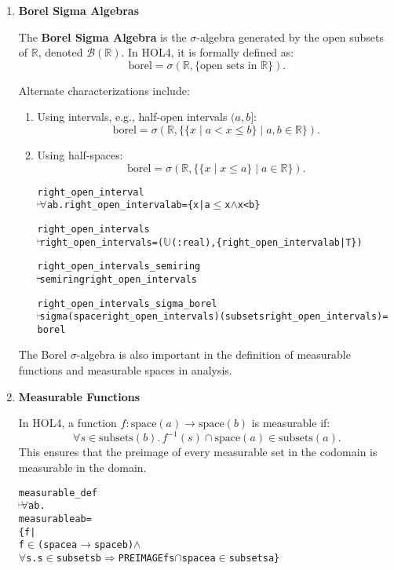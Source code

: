 \begin{enumerate}
\item \textbf{Borel Sigma Algebras}

The \textbf{Borel Sigma Algebra} is the \(\sigma\)-algebra generated by the open subsets of \(\mathbb{R}\), denoted \(\mathcal{B}(\mathbb{R})\). In HOL4, it is formally defined as:
\[
\text{borel} = \sigma(\mathbb{R}, \{\text{open sets in } \mathbb{R}\}).
\]

Alternate characterizations include:

\begin{enumerate}
    \item Using intervals, e.g., half-open intervals \((a, b]\):
   \[
   \text{borel} = \sigma(\mathbb{R}, \{\{x \mid a < x \leq b\} \mid a, b \in \mathbb{R}\}).
   \]

    \item Using half-spaces:
   \[
   \text{borel} = \sigma(\mathbb{R}, \{\{x \mid x \leq a\} \mid a \in \mathbb{R}\}).
   \]

   \begin{hol}
     \begin{alltt}
   right_open_interval
   \(\!\!\!{\turn}\!\!\!\!\) \(\forall\)a b. right_open_interval a b = \{x | a \(\le\) x \(\land\) x < b\}

   right_open_intervals
   \(\!\!\!{\turn}\!\!\!\!\) right_open_intervals = (\(\mathbb{U}\)(:real),\{right_open_interval a b | T\})
     \end{alltt}
   \end{hol}
   \begin{hol}
     \begin{alltt}
   right_open_intervals_semiring
   \(\!\!\!{\turn}\!\!\!\!\) semiring right_open_intervals

   right_open_intervals_sigma_borel
   \(\!\!\!{\turn}\!\!\!\!\) sigma (space right_open_intervals) (subsets right_open_intervals) =
       borel
     \end{alltt}
   \end{hol}
\end{enumerate}

The Borel \(\sigma\)-algebra is also important in the definition of measurable functions and measurable spaces in analysis.

    \item \textbf{Measurable Functions}

In HOL4, a function \(f : \text{space}(a) \to \text{space}(b)\) is measurable if:
\[
\forall s \in \text{subsets}(b).\, f^{-1}(s) \cap \text{space}(a) \in \text{subsets}(a).
\]
This ensures that the preimage of every measurable set in the codomain is measurable in the domain.

\begin{hol}
  \begin{alltt}
    measurable_def
    \(\!\!\!{\turn}\!\!\!\!\) \(\forall\)a b.
    measurable a b =
    \{f |
    f \(\in\) (space a \(\to\) space b) \(\land\)
    \(\forall\)s. s \(\in\) subsets b \(\Rightarrow\) PREIMAGE f s \(\cap\) space a \(\in\) subsets a\}
  \end{alltt}
\end{hol}

\end{enumerate}

